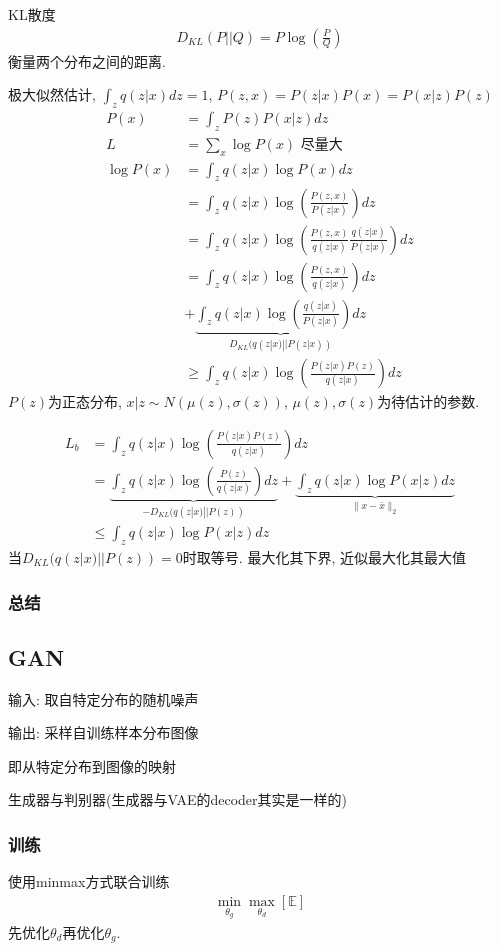 KL散度
\begin{align*}
    D_{KL}(P||Q)=P\log \left(\frac{P}{Q}\right)
\end{align*}
衡量两个分布之间的距离. 

极大似然估计, $\int_z q(z|x)dz=1$, $P(z,x)=P(z|x)P(x)=P(x|z)P(z)$
\begin{align*}
    P(x)&=\int_z P(z)P(x|z)dz\\
    L&=\sum_x\log P(x) \text{ 尽量大}\\
    \log P(x)&=\int_z q(z|x)\log P(x)dz\\
    &=\int_z q(z|x) \log\left( \frac{P(z,x)}{P(z|x)} \right)dz\\
    &=\int_z q(z|x) \log\left( \frac{P(z,x)}{q(z|x)}\frac{q(z|x)}{P(z|x)} \right)dz\\
    &=\int_z q(z|x) \log\left( \frac{P(z,x)}{q(z|x)} \right)dz\\
    &+\underbrace{\int_z q(z|x) \log\left( \frac{q(z|x)}{P(z|x)} \right) dz}_{D_{KL}(q(z|x)||P(z|x))}\\
    &\ge\int_z q(z|x) \log\left( \frac{P(z|x)P(z)}{q(z|x)} \right) dz
\end{align*}
$P(z)$为正态分布, $x|z \sim N(\mu(z), \sigma(z))$, $\mu(z), \sigma(z)$为待估计的参数. 

\begin{align*}
    L_b&=\int_z q(z|x) \log\left( \frac{P(z|x)P(z)}{q(z|x)} \right)dz \\
    &=\underbrace{\int_z q(z|x) \log\left( \frac{P(z)}{q(z|x)} \right) dz}_{-D_{KL}(q(z|x)|| P(z))}+\underbrace{\int_z q(z|x) \log P(x|z) dz}_{\|x-\bar{x} \|_2}\\
    &\le \int_z q(z|x) \log P(x|z) dz
\end{align*}
当$D_{KL}(q(z|x)|| P(z))=0$时取等号. 最大化其下界, 近似最大化其最大值

\subsubsection{总结}


\subsection{GAN}
输入: 取自特定分布的随机噪声

输出: 采样自训练样本分布图像

即从特定分布到图像的映射

生成器与判别器(生成器与VAE的decoder其实是一样的)

\subsubsection{训练}
使用minmax方式联合训练
\begin{align*}
    \min_{\theta_g}\max_{\theta_d}\left[ \mathbb{E}  \right]
\end{align*}
先优化$\theta_d$再优化$\theta_g$. 


